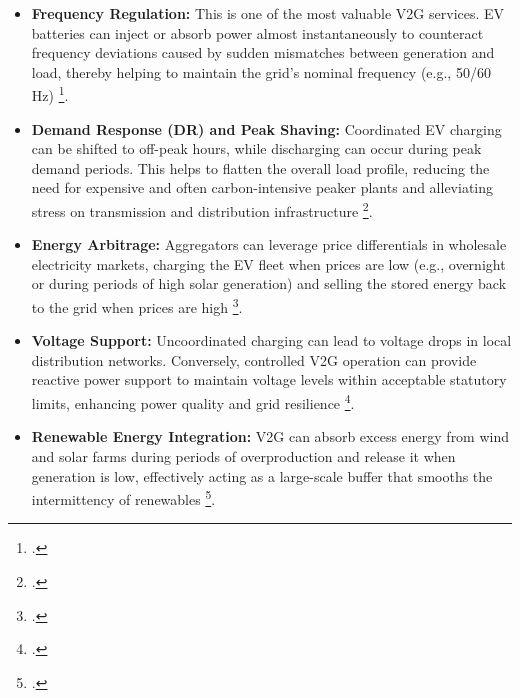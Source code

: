\begin{itemize}
    \item \textbf{Frequency Regulation:} This is one of the most valuable V2G services. EV batteries can inject or absorb power almost instantaneously to counteract frequency deviations caused by sudden mismatches between generation and load, thereby helping to maintain the grid's nominal frequency (e.g., 50/60 Hz) \footcite{alfaverh2022optimal}.
    \item \textbf{Demand Response (DR) and Peak Shaving:} Coordinated EV charging can be shifted to off-peak hours, while discharging can occur during peak demand periods. This helps to flatten the overall load profile, reducing the need for expensive and often carbon-intensive peaker plants and alleviating stress on transmission and distribution infrastructure \footcite{orfanoudakis2022deep, van2011peak}.
    \item \textbf{Energy Arbitrage:} Aggregators can leverage price differentials in wholesale electricity markets, charging the EV fleet when prices are low (e.g., overnight or during periods of high solar generation) and selling the stored energy back to the grid when prices are high \footcite{alfaverh2022optimal}.
    \item \textbf{Voltage Support:} Uncoordinated charging can lead to voltage drops in local distribution networks. Conversely, controlled V2G operation can provide reactive power support to maintain voltage levels within acceptable statutory limits, enhancing power quality and grid resilience \footcite{wang2023deep}.
    \item \textbf{Renewable Energy Integration:} V2G can absorb excess energy from wind and solar farms during periods of overproduction and release it when generation is low, effectively acting as a large-scale buffer that smooths the intermittency of renewables \footcite{khan2024review}.
\end{itemize}

